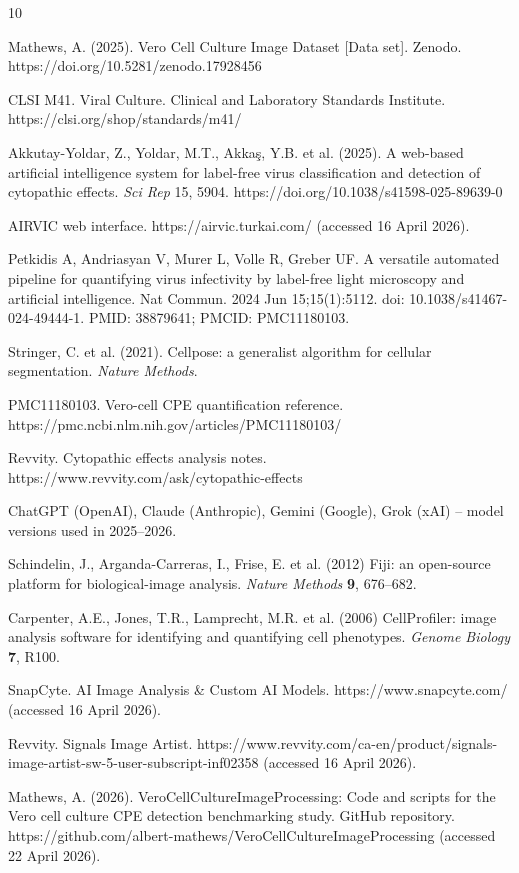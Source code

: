\documentclass[12pt,a4paper]{article}
\begin{document}
\begin{thebibliography}{10}

 Mathews, A. (2025). Vero Cell Culture Image Dataset [Data set]. Zenodo. https://doi.org/10.5281/zenodo.17928456

 CLSI M41. Viral Culture. Clinical and Laboratory Standards Institute. https://clsi.org/shop/standards/m41/

 Akkutay-Yoldar, Z., Yoldar, M.T., Akkaş, Y.B. et al. (2025). A web-based artificial intelligence system for label-free virus classification and detection of cytopathic effects. \textit{Sci Rep} 15, 5904. https://doi.org/10.1038/s41598-025-89639-0

 AIRVIC web interface. https://airvic.turkai.com/ (accessed 16 April 2026).

 Petkidis A, Andriasyan V, Murer L, Volle R, Greber UF. A versatile automated pipeline for quantifying virus infectivity by label-free light microscopy and artificial intelligence. Nat Commun. 2024 Jun 15;15(1):5112. doi: 10.1038/s41467-024-49444-1. PMID: 38879641; PMCID: PMC11180103.

 Stringer, C. et al. (2021). Cellpose: a generalist algorithm for cellular segmentation. \textit{Nature Methods}.

 PMC11180103. Vero-cell CPE quantification reference. https://pmc.ncbi.nlm.nih.gov/articles/PMC11180103/

 Revvity. Cytopathic effects analysis notes. https://www.revvity.com/ask/cytopathic-effects

 ChatGPT (OpenAI), Claude (Anthropic), Gemini (Google), Grok (xAI) -- model versions used in 2025--2026.

 Schindelin, J., Arganda-Carreras, I., Frise, E. et al. (2012) Fiji: an open-source platform for biological-image analysis. \textit{Nature Methods} \textbf{9}, 676–682.

 Carpenter, A.E., Jones, T.R., Lamprecht, M.R. et al. (2006) CellProfiler: image analysis software for identifying and quantifying cell phenotypes. \textit{Genome Biology} \textbf{7}, R100.

 SnapCyte. AI Image Analysis \& Custom AI Models. https://www.snapcyte.com/ (accessed 16 April 2026).

 Revvity. Signals Image Artist. https://www.revvity.com/ca-en/product/signals-image-artist-sw-5-user-subscript-inf02358 (accessed 16 April 2026).

Mathews, A. (2026). VeroCellCultureImageProcessing: Code and scripts for the Vero cell culture CPE detection benchmarking study. GitHub repository. https://github.com/albert-mathews/VeroCellCultureImageProcessing (accessed 22 April 2026).

\end{thebibliography}
\end{document}
